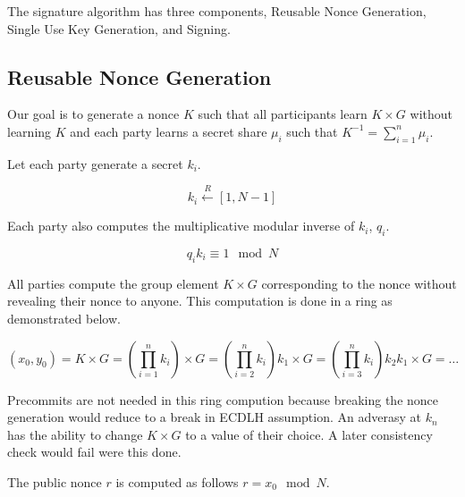 \documentclass{article}
\begin{document}
The signature algorithm has three components, Reusable Nonce Generation, Single Use Key Generation, and Signing.

\subsection{Reusable Nonce Generation}
Our goal is to generate a nonce $K$ such that all participants learn
$K\times G$ without learning $K$ and each party learns a secret share $\mu_i$ such that $K^{-1} = \sum_{i=1}^{n}\mu_i$.

Let each party generate a secret $k_i$.

$$k_i \xleftarrow{R} [1, N-1]$$

Each party also computes the multiplicative modular inverse of $k_i$, $q_i$. 

$$q_i k_i \equiv 1 \mod N$$

All parties compute the group element $K\times G$ corresponding to the nonce without revealing their nonce to anyone. This computation is done in a ring as demonstrated below.

$$(x_0, y_0) = K \times G = \left(\prod_{i=1}^n  k_i\right) \times G = \left(\prod_{i=2}^n k_i\right) k_1 \times G = \left(\prod_{i=3}^n k_i\right) k_2 k_1 \times G=\ldots$$

Precommits are not needed in this ring compution because breaking the nonce generation would reduce to a break in ECDLH assumption. An adverasy at $k_n$ has the ability to change $K\times G$ to a value of their choice. A later consistency check would fail were this done.

The public nonce $r$ is computed as follows $ r = x_0 \mod N $.
\end{document}
